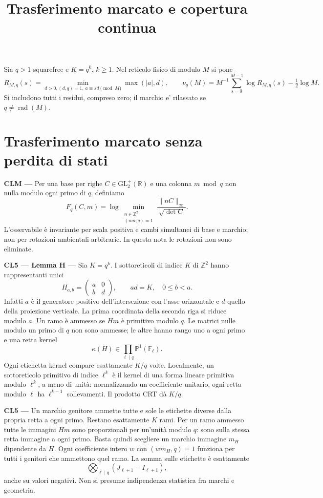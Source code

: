 \documentclass[11pt,a4paper]{article}
\title{Trasferimento marcato e copertura continua}\date{}
\newcommand{\CL}[1]{\textbf{#1 --- }}
\newcommand{\rad}{\operatorname{rad}}
\newcommand{\F}{\mathbb F}
\newcommand{\norm}[1]{\lVert#1\rVert}
\begin{document}
\maketitle
Sia $q>1$ squarefree e $K=q^k$, $k\ge1$. Nel reticolo fisico di modulo $M$ si pone
\[
R_{M,q}(s)=\min_{d>0,(d,q)=1,\ a\equiv sd\pmod M}\max(|a|,d),\qquad
\nu_q(M)=M^{-1}\sum_{s=0}^{M-1}\log R_{M,q}(s)-\tfrac12\log M.
\]
Si includono tutti i residui, compreso zero; il marchio e' rilassato se $q\ne\rad(M)$.
\section{Trasferimento marcato senza perdita di stati}
\CL{CLM} Per una base per righe $C\in\mathrm{GL}_2^+(\mathbb R)$ e una colonna $m\bmod q$ non nulla modulo ogni primo di $q$, definiamo
\[
F_q(C,m)=\log\min_{\substack{n\in\mathbb Z^2\\(nm,q)=1}}
\frac{\norm{nC}_\infty}{\sqrt{\det C}}.
\]
L'osservabile è invariante per scala positiva e cambi simultanei di base e marchio; non per rotazioni ambientali arbitrarie. In questa nota le rotazioni non sono eliminate.

\CL{CL5 --- Lemma H} Sia $K=q^k$. I sottoreticoli di indice $K$ di $\mathbb Z^2$ hanno rappresentanti unici
\[
H_{a,b}=\begin{pmatrix}a&0\\b&d\end{pmatrix},\qquad ad=K,\quad0\le b<a.
\]
Infatti $a$ è il generatore positivo dell'intersezione con l'asse orizzontale e $d$ quello della proiezione verticale. La prima coordinata della seconda riga si riduce modulo $a$.
Un ramo è ammesso se $Hm$ è primitivo modulo $q$. Le matrici nulle modulo un primo di $q$ non sono ammesse; le altre hanno rango uno a ogni primo e una retta kernel
\[
\kappa(H)\in\prod_{\ell\mid q}\mathbb P^1(\F_\ell).
\]
Ogni etichetta kernel compare esattamente $K/q$ volte. Localmente, un sottoreticolo primitivo di indice $\ell^k$ è il kernel di una forma lineare primitiva modulo $\ell^k$, a meno di unità: normalizzando un coefficiente unitario, ogni retta modulo $\ell$ ha $\ell^{k-1}$ sollevamenti. Il prodotto CRT dà $K/q$.

\CL{CL5} Un marchio genitore ammette tutte e sole le etichette diverse dalla propria retta a ogni primo. Restano esattamente $K$ rami. Per un ramo ammesso tutte le immagini $Hm$ sono proporzionali per un'unità modulo $q$: sono sulla stessa retta immagine a ogni primo. Basta quindi scegliere un marchio immagine $m_H$ dipendente da $H$. Ogni coefficiente intero $w$ con $(wm_H,q)=1$ funziona per tutti i genitori che ammettono quel ramo. La somma sulle etichette è esattamente
\[
\bigotimes_{\ell\mid q}(J_{\ell+1}-I_{\ell+1}),
\]
anche su valori negativi. Non si presume indipendenza statistica fra marchi e geometria.
\end{document}

